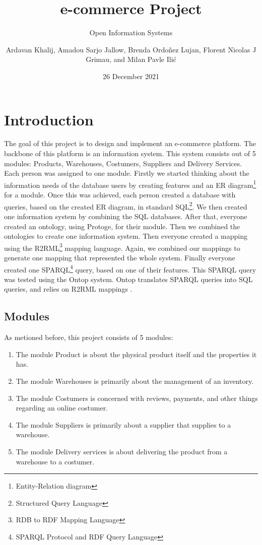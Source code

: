 \documentclass{article}
\title{e-commerce Project}
\subtitle{Open Information Systems}
\author{Ardavan Khalij, Amadou Sarjo Jallow, Brenda Ordoñez Lujan, Florent Nicolas J Grimau, and Milan Pavle Ili\'c}
\date{26 December 2021}
\begin{document}
\maketitle
\tableofcontents
\newpage
\section{Introduction}
The goal of this project is to design and implement an e-commerce platform. The backbone of this platform is an information system. This system consists out of 5 modules: Products, Warehouses, Costumers, Suppliers and Delivery Services. \\

Each person was assigned to one module. Firstly we started thinking about the information needs of the database users by creating features and an ER diagram\footnote{Entity-Relation diagram} for a module. Once this was achieved, each person created a database with queries, based on the created ER diagram, in standard SQL\footnote{Structured Query Language}. We then created one information system by combining the SQL databases. After that, everyone created an ontology, using Protoge, for their module. Then we combined the ontologies to create one information system. Then everyone created a mapping using the R2RML\footnote{RDB to RDF Mapping Language} mapping language. Again, we combined our mappings to generate one mapping that represented the whole system. Finally everyone created one SPARQL\footnote{SPARQL Protocol and RDF Query Language} query, based on one of their features. This SPARQL query was tested using the Ontop system. Ontop translates SPARQL queries into SQL queries, and relies on R2RML mappings \cite{OntopVK}.

\subsection{Modules}
As metioned before, this project consists of 5 modules:
\begin{enumerate}
  \item The module Product is about the physical product itself and the properties it has.

  \item The module Warehouses is primarily about the management of an inventory.

  \item The module Costumers is concerned with reviews, payments, and other things regarding an online costumer.

  \item The module Suppliers is primarily about a supplier that supplies to a warehouse.

  \item The module Delivery services is about delivering the product from a warehouse to a costumer.
\end{enumerate}
\end{document}
